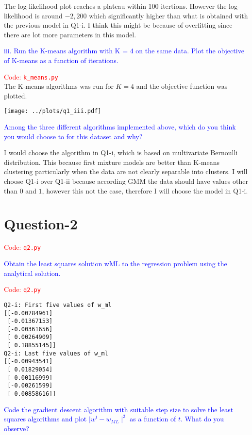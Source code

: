 The log-likelihood plot reaches a plateau within 100 itertions. However the log-likelihood is around $-2,200$ which significantly higher than what is obtained with the previous model in Q1-i. I think this might be because of overfitting since there are lot more parameters in this model.

\vspace*{24pt}

\textcolor{blue}{iii. Run the K-means algorithm with K = 4 on the same data. Plot the objective of K-means as a function of iterations.}

\textcolor{red}{Code: \texttt{k\_means.py}}\\
The K-means algorithms was run for $K = 4$ and the objective function was plotted.

\begin{center}
	\texttt{[image: ../plots/q1\_iii.pdf]}	
\end{center}

\textcolor{blue}{Among the three different algorithms implemented above, which do you think
you would choose to for this dataset and why?}

I would choose the algorithm in Q1-i, which is based on multivariate Bernoulli distribution. This because first mixture models are better than K-means clustering particularly when the data are not clearly separable into clusters. I will choose Q1-i over Q1-ii because according GMM the data should have values other than $0$ and $1$, however this not the case, therefore I will choose the model in Q1-i.


\section*{Question-2}
\textcolor{red}{Code: \texttt{q2.py}}

\textcolor{blue}{Obtain the least squares solution wML to the regression problem using the analytical solution.}

\textcolor{red}{Code: \texttt{q2.py}}

\begin{verbatim}
Q2-i: First five values of w_ml
[[-0.00784961]
 [-0.01367153]
 [-0.00361656]
 [ 0.00264909]
 [ 0.18855145]]
Q2-i: Last five values of w_ml
[[-0.00943541]
 [ 0.01829054]
 [-0.00116999]
 [-0.00261599]
 [-0.00858616]]	
\end{verbatim}

\textcolor{blue}{Code the gradient descent algorithm with suitable step size to solve the least squares algorithms and plot $\mid w^t - w_{ML}\mid ^ 2$ as a function of $t$. What do you observe?}

